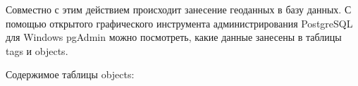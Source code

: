 \documentclass[12pt,a4paper,oneside]{article} %
\begin{document}
\begin{figure}[h!]
\end{figure}

Совместно с этим действием происходит занесение геоданных в базу \linebreak
данных. С помощью открытого графического инструмента \linebreak
администрирования PostgreSQL для Windows pgAdmin можно посмотреть, \linebreak
какие данные занесены в таблицы tags и objects.

\newpage
Содержимое таблицы objects:
\begin{figure}[h!]
\end{figure}
\end{document}
